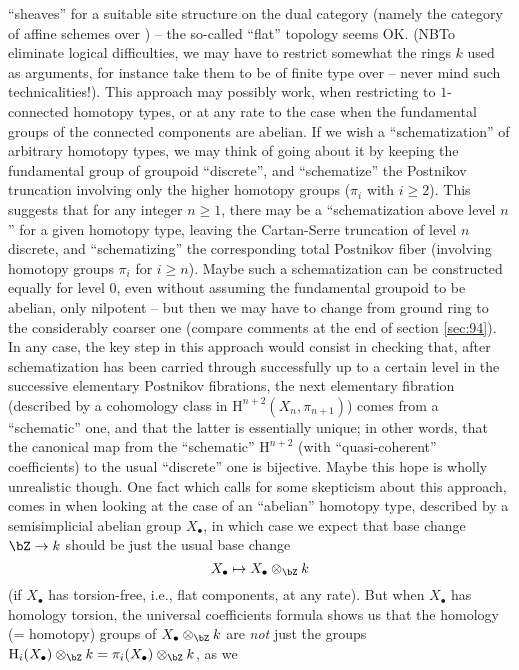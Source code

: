``sheaves'' for a suitable site structure on the dual category (namely
the category of affine schemes over \bZ) -- the so-called ``flat''
topology seems OK. (NB\enspace To eliminate logical difficulties, we
may have to restrict somewhat the rings $k$ used as arguments, for
instance take them to be of finite type over \bZ{} -- never mind such
technicalities!). This approach may possibly work, when restricting to
$1$-connected homotopy types, or at any rate to the case when the
fundamental groups of the connected components are abelian. If we wish
a ``schematization'' of arbitrary homotopy types, we may think of
going about it by keeping the fundamental group of groupoid
``discrete'', and ``schematize'' the Postnikov truncation
involving only the higher homotopy groups ($\pi_i$ with $i\ge2$). This
suggests that for any integer $n\ge1$, there may be a ``schematization
above level $n$'' for a given homotopy type, leaving the Cartan-Serre
truncation of level $n$ discrete, and ``schematizing'' the
corresponding total Postnikov fiber (involving homotopy groups $\pi_i$
for $i\ge n$). Maybe such a schematization can be constructed equally
for level $0$, even without assuming the fundamental groupoid to be
abelian, only nilpotent -- but then we may have to change from ground
ring \bZ{} to the considerably coarser one \bQ{} (compare comments at
the end of section \ref{sec:94}). In any case, the key step in this
approach would consist in checking that, after schematization has been
carried through successfully up to a certain level in the successive
elementary Postnikov fibrations, the next elementary fibration
(described by a cohomology class in $\mathrm H^{n+2}(X_n,\pi_{n+1})$)
comes from a ``schematic'' one, and that the latter is essentially
unique; in other words, that the canonical map from the ``schematic''
$\mathrm H^{n+2}$ (with ``quasi-coherent'' coefficients) to the usual
``discrete'' one is bijective. Maybe this hope is wholly unrealistic
though. One fact which calls for some skepticism about this approach,
comes in when looking at the case of an ``abelian'' homotopy type,
described by a semisimplicial abelian group $X_\bullet$, in which case
we expect that base change $\bZ\to k$ should be just the usual base
change
\[X_\bullet \mapsto X_\bullet \otimes_\bZ k\]
(if $X_\bullet$ has torsion-free, i.e., flat components, at any
rate). But when $X_\bullet$ has homology torsion, the universal
coefficients formula shows us that the homology (= homotopy) groups of
$X_\bullet\otimes_\bZ k$ are \emph{not} just the groups $\mathrm
H_i(X_\bullet) \otimes_\bZ k=\pi_i(X_\bullet)\otimes_\bZ k$, as we
